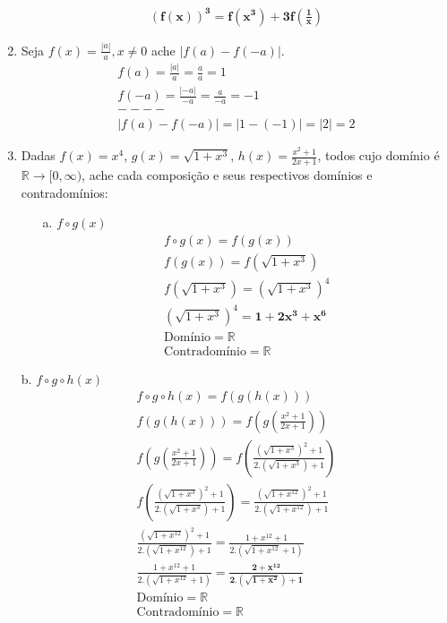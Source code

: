 \documentclass{article}
\begin{document}
\begin{enumerate}
\begin{gather*}
            \mathbf{(f(x))^{3} = f(x^{3})+3f\left(\frac{1}{x}\right)}
        \end{gather*}
    \item Seja $f(x) = \frac{|a|}{a}, x \neq 0$ ache $|f(a)-f(-a)|$.
        \begin{gather*}
            f(a) = \frac{|a|}{a} = \frac{a}{a} = 1 \\
            f(-a) = \frac{|-a|}{-a} = \frac{a}{-a} = -1 \\
            ----\\
            |f(a)-f(-a)| = |1-(-1)| = |2| = 2
        \end{gather*}
    \item Dadas $f(x) = x^{4}$, $g(x) = \sqrt{1+x^{3}}$, $h(x) = \frac{x^{2}+1}{2x+1}$, todos cujo domínio é $\mathbb{R} \to [0, \infty) $, ache cada composição e seus respectivos domínios e contradomínios:
        \begin{enumerate}
        \item[a.] $f \circ g(x)$
            \begin{gather*}
                f \circ g(x) = f(g(x)) \\
                f(g(x)) = f(\sqrt{1+x^{3}}) \\
                f(\sqrt{1+x^{3}}) = (\sqrt{1+x^{3}})^{4} \\
                (\sqrt{1+x^{3}})^{4} = \mathbf{1+2x^{3}+x^{6}} \\
                \text{Domínio} = \mathbb{R} \\
                \text{Contradomínio} = \mathbb{R}
            \end{gather*}
        \end{enumerate}
        \item[b.] $f \circ g \circ h(x)$
            \begin{gather*}
                f \circ g \circ h(x) = f(g(h(x))) \\
                f(g(h(x))) = f\left(g\left(\frac{x^{2}+1}{2x+1}\right)\right) \\
                f\left(g\left(\frac{x^{2}+1}{2x+1}\right)\right) = f\left(\frac{(\sqrt{1+x^{3}})^{2}+1}{2.(\sqrt{1+x^{3}})+1}\right) \\
                f\left(\frac{(\sqrt{1+x^{3}})^{2}+1}{2.(\sqrt{1+x^{3}})+1}\right) = \frac{(\sqrt{1+x^{12}})^{2}+1}{2.(\sqrt{1+x^{12}})+1} \\
                \frac{(\sqrt{1+x^{12}})^{2}+1}{2.(\sqrt{1+x^{12}})+1} = \frac{1+x^{12}+1}{2.(\sqrt{1+x^{12}}+1)} \\
                \frac{1+x^{12}+1}{2.(\sqrt{1+x^{12}}+1)} = \mathbf{\frac{2+x^{12}}{2.(\sqrt{1+x^{2}})+1}} \\
                \text{Domínio} = \mathbb{R} \\
                \text{Contradomínio} = \mathbb{R}
            \end{gather*}
\end{enumerate}
\end{document}
